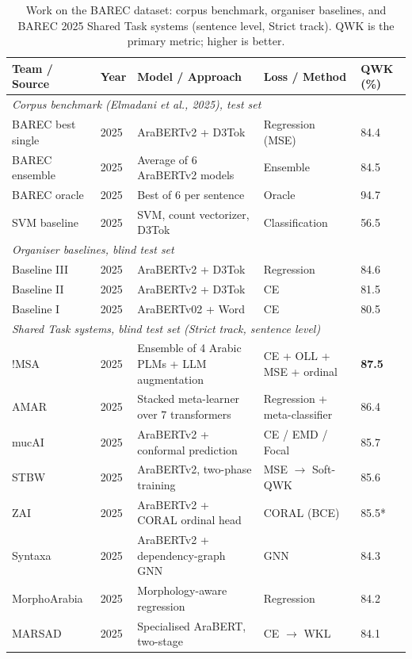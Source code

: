 \begin{table}[H]
\centering
\footnotesize
\caption{Work on the BAREC dataset: corpus benchmark, organiser baselines, and BAREC 2025 Shared
Task systems (sentence level, Strict track). QWK is the primary metric; higher is better.}
\label{tab:barec_systems}
\begin{tabular}{p{2.3cm} p{0.8cm} p{4.3cm} p{2.2cm} p{1.1cm}}
\toprule
\textbf{Team / Source} & \textbf{Year} & \textbf{Model / Approach} & \textbf{Loss / Method} &
\textbf{QWK (\%)} \\
\midrule
\multicolumn{5}{l}{\textit{Corpus benchmark (Elmadani et al., 2025), test set}} \\
\midrule
BAREC best single & 2025 & AraBERTv2 + D3Tok & Regression (MSE) & 84.4 \\
BAREC ensemble & 2025 & Average of 6 AraBERTv2 models & Ensemble & 84.5 \\
BAREC oracle & 2025 & Best of 6 per sentence & Oracle & 94.7 \\
SVM baseline & 2025 & SVM, count vectorizer, D3Tok & Classification & 56.5 \\
\midrule
\multicolumn{5}{l}{\textit{Organiser baselines, blind test set}} \\
\midrule
Baseline III & 2025 & AraBERTv2 + D3Tok & Regression & 84.6 \\
Baseline II & 2025 & AraBERTv2 + D3Tok & CE & 81.5 \\
Baseline I & 2025 & AraBERTv02 + Word & CE & 80.5 \\
\midrule
\multicolumn{5}{l}{\textit{Shared Task systems, blind test set (Strict track, sentence level)}}
\\
\midrule
!MSA & 2025 & Ensemble of 4 Arabic PLMs + LLM augmentation & CE + OLL + MSE + ordinal &
\textbf{87.5} \\
AMAR & 2025 & Stacked meta-learner over 7 transformers & Regression + meta-classifier & 86.4 \\
mucAI & 2025 & AraBERTv2 + conformal prediction & CE / EMD / Focal & 85.7 \\
STBW & 2025 & AraBERTv2, two-phase training & MSE $\rightarrow$ Soft-QWK & 85.6 \\
ZAI & 2025 & AraBERTv2 + CORAL ordinal head & CORAL (BCE) & 85.5* \\
Syntaxa & 2025 & AraBERTv2 + dependency-graph GNN & GNN & 84.3 \\
MorphoArabia & 2025 & Morphology-aware regression & Regression & 84.2 \\
MARSAD & 2025 & Specialised AraBERT, two-stage & CE $\rightarrow$ WKL & 84.1 \\

\end{tabular}
\end{table}
